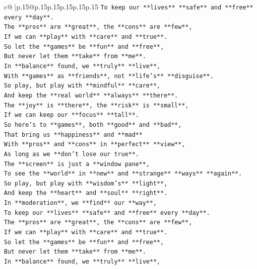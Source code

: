 \documentclass{article}
\begin{document}
{\begin{supertabular}{c@{$\;$}|p{.15\linewidth}@{}p{.15\linewidth}p{.15\linewidth}p{.15\linewidth}p{.15\linewidth}p{.15\linewidth}}
{{{\texttt{To keep our **lives** **safe** and **free** every **day**.} \\
\texttt{The **pros** are **great**, the **cons** are **few**,} \\
\texttt{If we can **play** with **care** and **true**.} \\
\texttt{So let the **games** be **fun** and **free**,} \\
\texttt{But never let them **take** from **me**.} \\
\texttt{In **balance** found, we **truly** **live**,} \\
\texttt{With **games** as **friends**, not **life's** **disguise**.} \\
\texttt{So play, but play with **mindful** **care**,} \\
\texttt{And keep the **real world** **always** **there**.} \\
\texttt{The **joy** is **there**, the **risk** is **small**,} \\
\texttt{If we can keep our **focus** **tall**.} \\
\texttt{So here's to **games**, both **good** and **bad**,} \\
\texttt{That bring us **happiness** and **mad**} \\
\texttt{With **pros** and **cons** in **perfect** **view**,} \\
\texttt{As long as we **don't lose our true**.} \\
\texttt{The **screen** is just a **window pane**,} \\
\texttt{To see the **world** in **new** and **strange** **ways** **again**.} \\
\texttt{So play, but play with **wisdom's** **light**,} \\
\texttt{And keep the **heart** and **soul** **right**.} \\
\texttt{In **moderation**, we **find** our **way**,} \\
\texttt{To keep our **lives** **safe** and **free** every **day**.} \\
\texttt{The **pros** are **great**, the **cons** are **few**,} \\
\texttt{If we can **play** with **care** and **true**.} \\
\texttt{So let the **games** be **fun** and **free**,} \\
\texttt{But never let them **take** from **me**.} \\
\texttt{In **balance** found, we **truly** **live**,} \\
}}}
\end{supertabular}}
\end{document}
